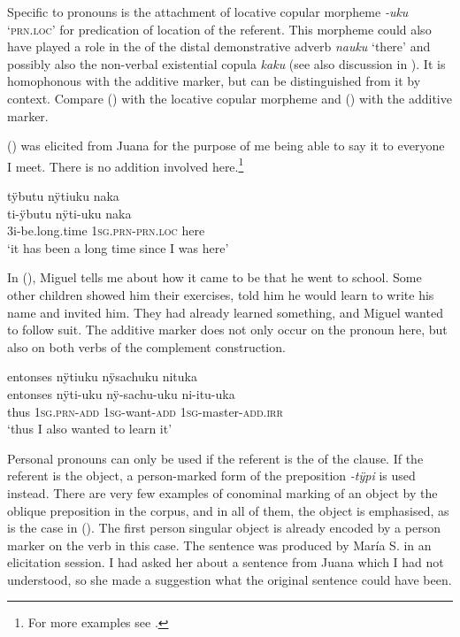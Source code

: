 Specific to pronouns is the attachment of locative copular morpheme \textit{-uku} ‘\textsc{prn.loc}’ for predication of location of the referent. This morpheme could also have played a role in the  of the distal demonstrative adverb \textit{nauku} ‘there’ and possibly also the non-verbal existential copula \textit{kaku} (see also discussion in ). It is homophonous with the additive marker, but can be distinguished from it by context. Compare () with the locative copular morpheme and () with the additive marker.

() was elicited from Juana for the purpose of me being able to say it to everyone I meet. There is no addition involved here.\footnote{For more examples see .}

\ea\label{ex:PersP-loc}
\begingl
\glpreamble tÿbutu nÿtiuku naka\\
\gla ti-ÿbutu nÿti-uku naka\\
\glb 3i-be.long.time 1\textsc{sg.prn}-\textsc{prn.loc} here\\
\glft ‘it has been a long time since I was here’
\endgl
\trailingcitation{[jxx-e150925l-1.046]}
\xe

In (), Miguel tells me about how it came to be that he went to school. Some other children showed him their exercises, told him he would learn to write his name and invited him. They had already learned something, and Miguel wanted to follow suit. The additive marker does not only occur on the pronoun here, but also on both verbs of the complement construction.

\ea\label{ex:PersP-add}
\begingl
\glpreamble entonses nÿtiuku nÿsachuku nituka\\
\gla entonses nÿti-uku nÿ-sachu-uku ni-itu-uka\\
\glb thus 1\textsc{sg.prn}-\textsc{add} 1\textsc{sg}-want-\textsc{add} 1\textsc{sg}-master-\textsc{add.irr}\\
\glft ‘thus I also wanted to learn it’
\endgl
\trailingcitation{[mxx-p181027l-1.013]}
\xe{}


Personal pronouns can only be used if the referent is the  of the clause. If the referent is the object, a person-marked form of the  preposition \textit{-tÿpi} is used instead. There are very few examples of conominal marking of an object by the oblique preposition in the corpus, and in all of them, the object is emphasised, as is the case in (). The first person singular object is already encoded by a person marker on the verb in this case. The sentence was produced by María S. in an elicitation session. I had asked her about a sentence from Juana which I had not understood, so she made a suggestion what the original sentence could have been.

